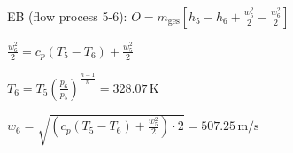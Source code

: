 EB (flow process 5-6):  
\( O = m_{\text{ges}} \left[ h_5 - h_6 + \frac{w_5^2}{2} - \frac{w_6^2}{2} \right] \)  

\( \frac{w_6^2}{2} = c_p \left( T_5 - T_6 \right) + \frac{w_5^2}{2} \)  

\( T_6 = T_5 \left( \frac{p_6}{p_5} \right)^{\frac{n-1}{n}} = 328.07 \, \text{K} \)  

\( w_6 = \sqrt{\left( c_p \left( T_5 - T_6 \right) + \frac{w_5^2}{2} \right) \cdot 2} = 507.25 \, \text{m/s} \)